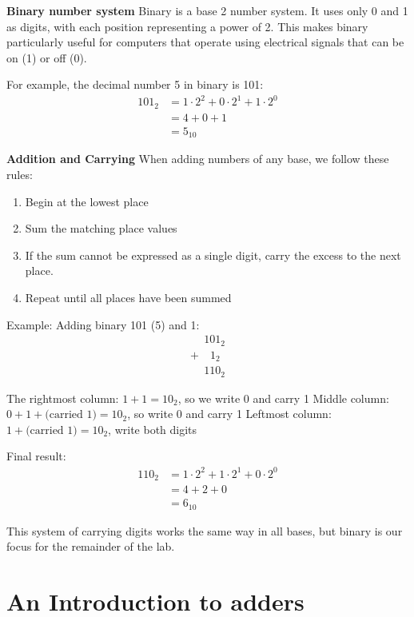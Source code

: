 \documentclass[12pt]{betterjournal}
\begin{document}
\noindent\textbf{Binary number system}\hfill\break
Binary is a base 2 number system. It uses only 0 and 1 as digits, with each position representing a power of 2. This makes binary particularly useful for computers that operate using electrical signals that can be on (1) or off (0).

For example, the decimal number 5 in binary is 101:
\begin{align*}
101_2 &= 1 \cdot 2^2 + 0 \cdot 2^1 + 1 \cdot 2^0 \\
&= 4 + 0 + 1 \\
&= 5_{10}
\end{align*}

\noindent\textbf{Addition and Carrying}\hfill\break
When adding numbers of any base, we follow these rules:
\begin{enumerate}
    \item Begin at the lowest place
    \item Sum the matching place values
    \item If the sum cannot be expressed as a single digit, carry the excess to the next place.
    \item Repeat until all places have been summed
\end{enumerate}

Example: Adding binary 101 (5) and 1:
\begin{equation*}
\begin{array}{r}
  \phantom{+}101_2\\
  +\phantom{10}1_2\\\hline
  \phantom{+}110_2
\end{array}
\end{equation*}

The rightmost column: $1 + 1 = 10_2$, so we write 0 and carry 1
Middle column: $0 + 1 + \text{(carried 1)} = 10_2$, so write 0 and carry 1
Leftmost column: $1 + \text{(carried 1)} = 10_2$, write both digits

Final result:
\begin{align*}    
110_2 &= 1 \cdot 2^2 + 1 \cdot 2^1 + 0 \cdot 2^0 \\
&= 4 + 2 + 0 \\
&= 6_{10}
\end{align*}

This system of carrying digits works the same way in all bases, but binary is our focus for the remainder of the lab.

\label{sec:review}

\section{An Introduction to adders}
\end{document}
